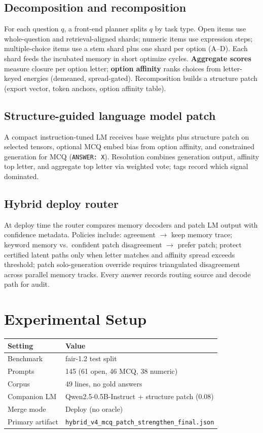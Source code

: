 \documentclass[11pt,a4paper]{article}
\begin{document}
\subsection{Decomposition and recomposition}
For each question $q$, a front-end planner splits $q$ by task type. Open items use whole-question and retrieval-aligned shards; numeric items use expression steps; multiple-choice items use a stem shard plus one shard per option (A--D). Each shard feeds the incubated memory in short optimize cycles. \textbf{Aggregate scores} measure closure per option letter; \textbf{option affinity} ranks choices from letter-keyed energies (demeaned, spread-gated). Recomposition builds a structure patch (export vector, token anchors, option affinity table).

\subsection{Structure-guided language model patch}
A compact instruction-tuned LM receives base weights plus structure patch on selected tensors, optional MCQ embed bias from option affinity, and constrained generation for MCQ (\texttt{ANSWER: X}). Resolution combines generation output, affinity top letter, and aggregate top letter via weighted vote; tags record which signal dominated.

\subsection{Hybrid deploy router}
At deploy time the router compares memory decoders and patch LM output with confidence metadata. Policies include: agreement $\rightarrow$ keep memory trace; keyword memory vs.\ confident patch disagreement $\rightarrow$ prefer patch; protect certified latent paths only when letter matches and affinity spread exceeds threshold; patch solo-generation override requires triangulated disagreement across parallel memory tracks. Every answer records routing source and decode path for audit.

\section{Experimental Setup}
\begin{table}[h]
\centering
\small
\begin{tabular}{ll}
\toprule
Setting & Value \\
\midrule
Benchmark & fair-1.2 test split \\
Prompts & 145 (61 open, 46 MCQ, 38 numeric) \\
Corpus & 49 lines, no gold answers \\
Companion LM & Qwen2.5-0.5B-Instruct + structure patch (0.08) \\
Merge mode & Deploy (no oracle) \\
Primary artifact & \texttt{hybrid\_v4\_mcq\_patch\_strengthen\_final.json} \\
\bottomrule
\end{tabular}
\end{table}
\end{document}

